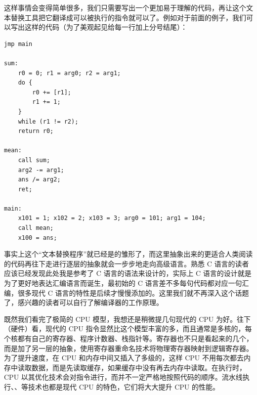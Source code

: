 
这样事情会变得简单很多，我们只需要写出一个更加易于理解的代码，再让这个文本替换工具把它翻译成可以被执行的指令就可以了。例如对于前面的例子，我们可以写出这样的代码（为了美观起见给每一行加上分号结尾）：
\begin{verbatim}
jmp main

sum:
    r0 = 0; r1 = arg0; r2 = arg1;
    do {
        r0 += [r1];
        r1 += 1;
    } 
    while (r1 != r2);
    return r0;

mean:
    call sum;
    arg2 -= arg1;
    ans /= arg2;
    ret;

main:
    x101 = 1; x102 = 2; x103 = 3; arg0 = 101; arg1 = 104;
    call mean;
    x100 = ans;
\end{verbatim}

事实上这个“文本替换程序”就已经是的雏形了，而这里抽象出来的更适合人类阅读的代码再往下走进行逐层的抽象就会一步步地走向高级语言。熟悉 C 语言的读者应该已经发现此处我是参考了 C 语言的语法来设计的，实际上 C 语言的设计就是为了更好地表达汇编语言而诞生，最初始的 C 语言差不多每句代码都对应一句汇编，很多现代 C 语言的特性是后续才慢慢添加的。这里我们就不再深入这个话题了，感兴趣的读者可以自行了解编译器的工作原理。

既然我们看完了极简的 CPU 模型，我想还是稍微提几句现代的 CPU 为好。往下（硬件）看，现代的 CPU 指令显然比这个模型丰富的多，而且通常是多核的，每个核都有自己的寄存器、程序计数器、栈指针等。寄存器也不只是看起来的几个，而是加了另一层的抽象，使用寄存器重命名技术将物理寄存器映射到逻辑寄存器。为了提升速度，在 CPU 和内存中间又插入了多级的，这样 CPU 不用每次都去内存中读取数据，而是先读取缓存，如果缓存中没有再去内存中读取。在执行时，CPU 以其优化技术会对指令进行，而并不一定严格地按照代码的顺序。流水线执行、、等技术也都是现代 CPU 的特色，它们将大大提升 CPU 的性能。

